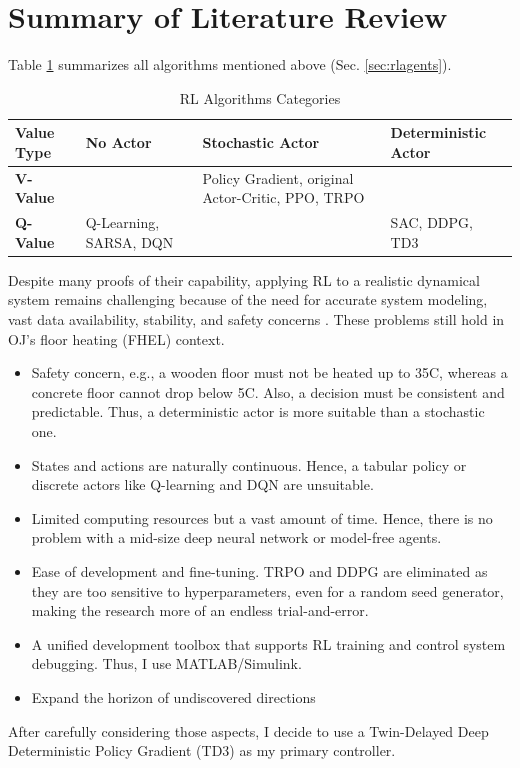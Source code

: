 \documentclass[../main.tex]{subfiles}
\begin{document}


\section{Summary of Literature Review}
Table \ref{tab:rlagents} summarizes all algorithms mentioned above (Sec. \ref{sec:rlagents}). 
\begin{table}[htb]
    \centering
    \caption{RL Algorithms Categories}
    \begin{tabular}{l p{4cm} p{4cm} p{4cm}}
    \hline
    \textbf{Value Type} & \textbf{No Actor} & \textbf{Stochastic Actor} & \textbf{Deterministic Actor} \\ \hline
    \textbf{V-Value} &  & Policy Gradient, original Actor-Critic, PPO, TRPO &  \\ \hline
    \textbf{Q-Value} & Q-Learning, SARSA, DQN &  & SAC, DDPG, TD3 \\ \hline
    \end{tabular}
    \label{tab:rlagents}
\end{table}
Despite many proofs of their capability, applying RL to a realistic dynamical system remains challenging because of the need for accurate system modeling, vast data availability, stability, and safety concerns \cite{sierla2022review, paleyes2022challenges}. These problems still hold in OJ's floor heating (FHEL) context.
\begin{itemize}
    \item Safety concern, e.g., a wooden floor must not be heated up to 35\degree C, whereas a concrete floor cannot drop below 5\degree C. Also, a decision must be consistent and predictable. Thus, a deterministic actor is more suitable than a stochastic one.
    \item States and actions are naturally continuous. Hence, a tabular policy or discrete actors like Q-learning and DQN are unsuitable.
    \item Limited computing resources but a vast amount of time. Hence, there is no problem with a mid-size deep neural network or model-free agents.
    \item Ease of development and fine-tuning. TRPO and DDPG are eliminated as they are too sensitive to hyperparameters, even for a random seed generator, making the research more of an endless trial-and-error.
    \item A unified development toolbox that supports RL training and control system debugging. Thus, I use MATLAB/Simulink.
    \item Expand the horizon of undiscovered directions
\end{itemize}
After carefully considering those aspects, I decide to use a Twin-Delayed Deep Deterministic Policy Gradient (TD3) as my primary controller.
\end{document}

